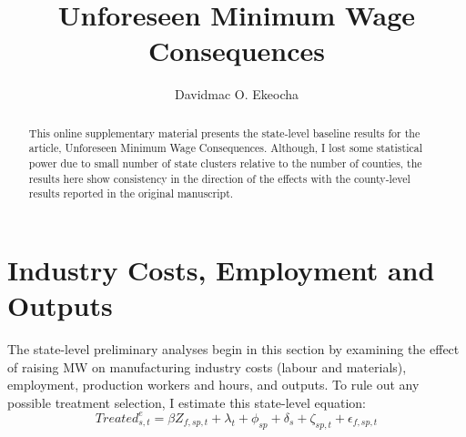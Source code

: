\documentclass{C:/Users/david/OneDrive/Documents/ULMS/PhD/Thesis/chapter3/src/climate_change/latex/Economic_Journal/OUP-EJ}
\begin{document}
    \title[Online Supplementary Material]{Unforeseen Minimum Wage Consequences}
    \author[1,*]{Davidmac O. Ekeocha}
    \begin{abstract}
        \noindent This online supplementary material presents the state-level baseline results for the article, Unforeseen Minimum Wage Consequences. Although, I lost some statistical power due to small number of state clusters relative to the number of counties, the results here show consistency in the direction of the effects with the county-level results reported in the original manuscript.
    \end{abstract}
    \maketitle


    \section{Industry Costs, Employment and Outputs}\label{sec:industry-costs-employment-and-outputs}
    The state-level preliminary analyses begin in this section by examining the effect of raising MW on manufacturing industry costs (labour and materials), employment, production workers and hours, and outputs. To rule out any possible treatment selection, I estimate this state-level equation:
    \begin{equation}
        Treated_{s,t}^e = \beta Z_{f,sp,t} + \lambda_{t} + \phi_{sp} + \delta_{s} + \zeta_{sp,t} + \epsilon_{f,sp,t}\label{eq:treatment-selection}
    \end{equation}
\end{document}
